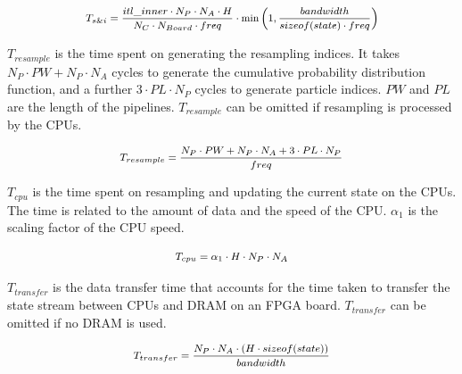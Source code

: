 \begin{equation}
\footnotesize
\begin{aligned}
T_{s\&i} = \frac{itl\_inner \cdot N_P \cdot N_A \cdot H}{N_C \cdot N_{Board} \cdot freq} \cdot \min\left(1,\frac{bandwidth}{sizeof(state) \cdot freq}\right)
\end{aligned}
\end{equation}

$T_{resample}$ is the time spent on generating the resampling indices.
It takes $N_P \cdot PW + N_P \cdot N_A$ cycles to generate the cumulative probability distribution function, and a further $3 \cdot PL \cdot N_P$ cycles to generate particle indices.
$PW$ and $PL$ are the length of the pipelines.
$T_{resample}$ can be omitted if resampling is processed by the CPUs.

\begin{equation}
\footnotesize
\begin{aligned}
T_{resample} = \frac{N_P \cdot PW + N_P \cdot N_A + 3 \cdot PL \cdot N_P}{freq}
\end{aligned}
\end{equation}

$T_{cpu}$ is the time spent on resampling and updating the current state on the CPUs.
The time is related to the amount of data and the speed of the CPU.
$\alpha_1$ is the scaling factor of the CPU speed.

\begin{equation}
\footnotesize
\begin{aligned}
T_{cpu} = \alpha_1 \cdot H \cdot N_P \cdot N_A
\end{aligned}
\end{equation}

$T_{transfer}$ is the data transfer time that accounts for the time taken to transfer the state stream between CPUs and DRAM on an FPGA board.
$T_{transfer}$ can be omitted if no DRAM is used.

\begin{equation}
\footnotesize
\begin{aligned}
T_{transfer} = \frac{N_P \cdot N_A \cdot \left ( H \cdot sizeof(state)\right)}{bandwidth}
\end{aligned}
\end{equation}


